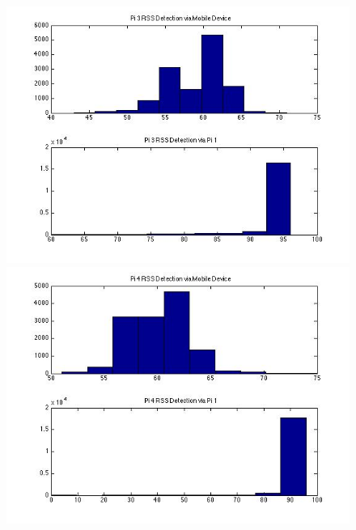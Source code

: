 \documentclass[10pt,conference]{IEEEtran}
\begin{document}
\begin{figure}[htbp]
\centering
\begin{minipage}[t]{0.2\textwidth}
	\centering
	\includegraphics[scale=0.2]{device0-1}
\end{minipage}
\begin{minipage}[t]{0.2\textwidth}
	\centering
	\includegraphics[scale=0.2]{device0-2}
\end{minipage}
\begin{minipage}[t]{0.2\textwidth}
	\centering

\end{minipage}
\end{figure}
\end{document}
